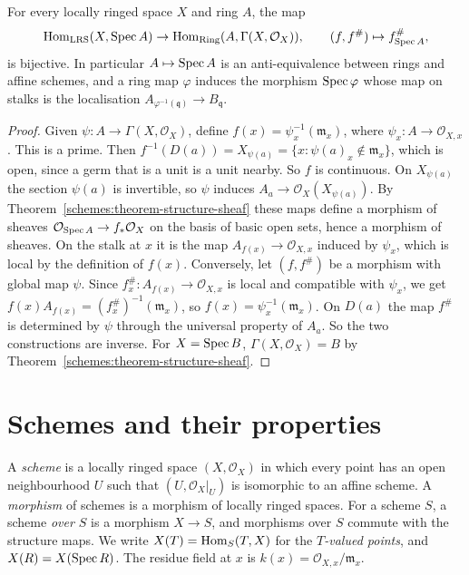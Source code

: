 \begin{theorem}\label{schemes:theorem-morphisms-to-affine}
For every locally ringed space $X$ and ring $A$, the map
\[
\operatorname{Hom}_{\mathrm{LRS}}(X, \operatorname{Spec} A) \to \operatorname{Hom}_{\mathrm{Ring}}(A, \Gamma(X, \mathcal{O}_X)), \qquad (f, f^\#) \mapsto f^\#_{\operatorname{Spec} A},
\]
is bijective. In particular $A \mapsto \operatorname{Spec} A$ is an anti-equivalence between rings and affine schemes, and a ring map $\varphi$ induces the
morphism $\operatorname{Spec}\varphi$ whose map on stalks is the localisation $A_{\varphi^{-1}(\mathfrak{q})} \to B_\mathfrak{q}$.
\end{theorem}

\begin{proof}
Given $\psi \colon A \to \Gamma(X, \mathcal{O}_X)$, define $f(x) = \psi_x^{-1}(\mathfrak{m}_x)$, where $\psi_x \colon A \to \mathcal{O}_{X,x}$. This is a prime. Then
$f^{-1}(D(a)) = X_{\psi(a)} = \{x : \psi(a)_x \notin \mathfrak{m}_x\}$, which is open, since a germ that is a unit is a unit nearby. So $f$ is continuous. On
$X_{\psi(a)}$ the section $\psi(a)$ is invertible, so $\psi$ induces $A_a \to \mathcal{O}_X(X_{\psi(a)})$. By Theorem~\ref{schemes:theorem-structure-sheaf}
these maps define a morphism of sheaves $\mathcal{O}_{\operatorname{Spec} A} \to f_*\mathcal{O}_X$ on the basis of basic open sets, hence a morphism of sheaves. On the stalk
at $x$ it is the map $A_{f(x)} \to \mathcal{O}_{X,x}$ induced by $\psi_x$, which is local by the definition of $f(x)$. Conversely, let $(f, f^\#)$ be a
morphism with global map $\psi$. Since $f^\#_x \colon A_{f(x)} \to \mathcal{O}_{X,x}$ is local and compatible with $\psi_x$, we get
$f(x)A_{f(x)} = (f^\#_x)^{-1}(\mathfrak{m}_x)$, so $f(x) = \psi_x^{-1}(\mathfrak{m}_x)$. On $D(a)$ the map $f^\#$ is determined by $\psi$ through the universal property
of $A_a$. So the two constructions are inverse. For $X = \operatorname{Spec} B$, $\Gamma(X, \mathcal{O}_X) = B$ by Theorem~\ref{schemes:theorem-structure-sheaf}.
\end{proof}

\section{Schemes and their properties}\label{schemes:section-schemes}

\begin{definition}\label{schemes:definition-scheme}
A \emph{scheme} is a locally ringed space $(X, \mathcal{O}_X)$ in which every point has an open neighbourhood $U$ such that $(U, \mathcal{O}_X|_U)$ is
isomorphic to an affine scheme. A \emph{morphism} of schemes is a morphism of locally ringed spaces. For a scheme $S$, a scheme \emph{over $S$} is a
morphism $X \to S$, and morphisms over $S$ commute with the structure maps. We write $X(T) = \operatorname{Hom}_S(T, X)$ for the \emph{$T$-valued points}, and
$X(R) = X(\operatorname{Spec} R)$. The residue field at $x$ is $k(x) = \mathcal{O}_{X,x}/\mathfrak{m}_x$.
\end{definition}

